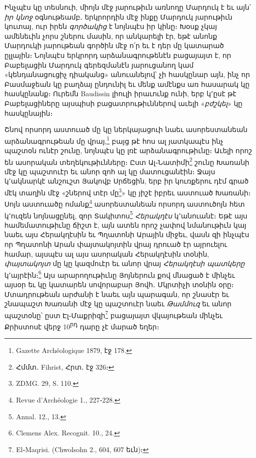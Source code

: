 \documentclass{article}
\begin{document}
{Ինչպէս կը տեսնուի, միոյն մէջ յարութիւն առնողը Մարդուկ է եւ այն՝ \emph{իր կնոջ} օգնութեամբ․ երկրորդին մէջ ինքը Մարդուկ յարութիւն կուտայ, ուր իրեն \emph{գործակից} է նոյնպէս իր կինը։ Խօսք չկայ ամենեւին չորս շներու մասին, որ անկարելի էր, եթէ անոնք Մարդուկի յարութեան գործին մէջ ո՛ր եւ է դեր մը կատարած ըլլային։ Նոյնպէս երկրորդ արձանագրութենէն բացայայտ է, որ Բաբելացին Մարդուկ գերեզմանէն յարուցանող կամ «կենդանացուցիչ դիականց» անուանելով՝ չի հասկընար այն, ինչ որ Բասմաջեան կը բաղձայ ընդունիլ եւ մենք ամէնքս առ հասարակ կը հասկընանք։ Ուրեմն Baudissin լիուլի իրաւունք ունի, երբ կ՚ըսէ թէ Բաբելացիները այսպիսի բացատրութիւններով աւելի «\emph{բժշկել}» կը հասկընային։

Շնով որսորդ աստուած մը կը ներկայացուի նաեւ ասորեստանեան արձանագրութեան մը վրայ,\footnote{Gazette Archéologique 1879, էջ 178.} բայց թէ հոս ալ յատկապէս ինչ պաշտօն ունէր շունը, նոյնպէս կը լռէ արձանագրութիւնը։ Աւելի որոշ են ասորական տեղեկութիւնները։ Ըստ Ալ֊Նատիմի\footnote{Հմմտ․ Fihrist, Հրտ․ էջ 326։} շունը Խառանի մէջ կը պաշտուէր եւ անոր զոհ ալ կը մատուցանէին։ Ջայս կ՚ակնարկէ անշուշտ Յակովբ Սրճեցին, երբ իր կուռքերու դէմ գրած մէկ տաղին մէջ «շներով տէր մը\footnote{ZDMG. 29, S. 110.}» կը յիշէ իբրեւ աստուած Խառանի։ Սոյն աստուածը ոմանք\footnote{Revue d'Archéologie 1., 227֊228.} ասորեստանեան որսորդ աստուծոյն հետ կ՚ուզեն նոյնացընել, զոր Տակիտոս\footnote{Annal. 12., 13.} \emph{Հերակղէս} կ՚անուանէ։ Եթէ այս համեմատութիւնը ճիշտ է, այն ատեն որոշ չափով նմանութիւն կայ նաեւ այս Հերակղէսին եւ Պղատոնի Արային միջեւ, վասն զի ինչպէս որ Պղատոնի Արան փայտակոյտին վրայ դրուած էր այրուելու համար, այսպէս ալ այս ասորական Հերակղէսին տօնին, \emph{փայտակոյտ} մը կը կազմուէր եւ անոր վրայ \emph{Հերակղէսի պատկերը} կ՚այրէին։\footnote{Clemens Alex. Recognit. 10., 24.} Այս արարողութիւնը Յոյներուն քով մնացած է մինչեւ այսօր եւ կը կատարեն սովորաբար Յովհ․ Մկրտիչի տօնին օրը։ Մտադրութեան արժանի է նաեւ այն պարագան, որ շնասէր եւ շնապաշտ Խառանի մէջ կը պաշտուէր նաեւ \emph{Թամմուզ} եւ անոր պաշտօնը՝ ըստ Էլ֊Մաքրիզի\footnote{El֊Maqrisi. (Chwolsohn 2., 604, 607 եւն)։} բացայայտ վկայութեան մինչեւ Քրիստոսէ վերջ 10\textsuperscript{րդ} դարը չէ մարած եղեր։

}
\end{document}
